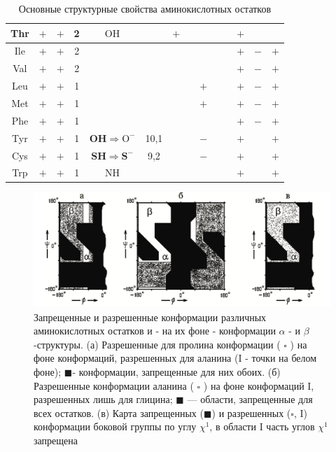 \documentclass[
11pt,%
tightenlines,%
twoside,%
onecolumn,%
nofloats,%
nobibnotes,%
nofootinbib,%
superscriptaddress,%
noshowpacs,%
centertags]%
{revtex4}
\begin{document}
\begin{table}[!ht]
\begin{tabular}{|c|c|c|c|c|c|c|c|c|c|c|c|c|c|}
		\hline Thr & $+$ & $+$ & 2 & $\mathrm{OH}$ & & $+$ & & & & & \boldmath$+$ & & \\
		\hline Ile & $+$ & $+$ & 2 & & & & & & & & \boldmath$+$ & $-$ & \boldmath$+$ \\
		\hline Val & $+$ & $+$ & 2 & & & & & & & & \boldmath$+$ & $-$ & \boldmath$+$ \\
		\hline Leu & $+$ & $+$ & 1 & & & & & \boldmath$+$ & & & $+$ & \boldmath$-$ & \boldmath$+$ \\
		\hline Met & $+$ & $+$ & 1 & & & & & \boldmath$+$ & & & \boldmath$+$ & \boldmath$-$ & \boldmath$+$ \\
		\hline Phe & $+$ & $+$ & 1 & & & & & & & & $+$ & $-$ & \boldmath$+$ \\
		\hline Tyr &$+$ & $+$ & 1 & $\mathbf{O H} \Rightarrow \mathrm{O}^{-}$ & 10,1 & & &$-$ & & & $+$ & & $+$ \\
		\hline Cys & $+$ & $+$ & 1 & $\mathbf{S H} \Rightarrow \mathbf{S}^{-}$ & 9,2 & & & $-$ & & & $+$ & & \boldmath$+$ \\
		\hline Trp & $+$ & $+$ & 1 & $\mathrm{NH}$ & & & & & & & $+$ & & $+$ \\
		\hline
	\end{tabular}
	\caption{Основные структурные свойства аминокислотных остатков}
\end{table}
\begin{figure}[!ht]
	\centering
	\includegraphics[width=\textwidth]{zone}
	\caption{Запрещенные и разрешенные конформации различных аминокислотных остатков и - на их фоне - конформации $\alpha$ - и $\beta$-структуры. (а) Разрешенные для пролина конформации ( $\square$ ) на фоне конформаций, разрешенных для аланина (I - точки на белом фоне); $\blacksquare$- конформации, запрещенные для них обоих. (б) Разрешенные конформации аланина ( $\square$ ) на фоне конформаций I, разрешенных лишь для глицина; $\blacksquare$ — области, запрещенные для всех остатков. (в) Карта запрещенных ($\blacksquare$) и разрешенных ($\square$, I) конформации боковой группы по углу $\chi^1$, в области I часть углов $\chi^1$ запрещена}
\end{figure}
\end{document}
